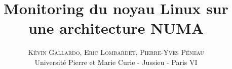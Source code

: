 \documentclass[twoside]{article}
\title{\vspace{-15mm}\fontsize{24pt}{10pt}\selectfont\textbf{Monitoring du noyau Linux sur une architecture NUMA}}
\author{
\large
\textsc{Kévin Gallardo, Eric Lombardet, Pierre-Yves Péneau}\\[2mm] 
\normalsize Université Pierre et Marie Curie - Jussieu - Paris VI
\vspace{-5mm}
}
\date{}
\begin{document}
  \maketitle

  \thispagestyle{fancy}

  \begin{abstract}
    \noindent 
  \end{abstract}

  \begin{multicols}{2}
    
    
  \end{multicols}
\end{document}
